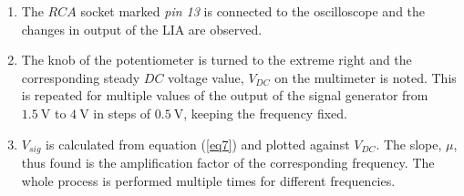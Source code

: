 \documentclass[%
 reprint,
nofootinbib,
 amsmath,amssymb,
 aps,
]{revtex4-2}
\begin{document}
\begin{enumerate}
        \item The $RCA$ socket marked \textit{pin 13} is connected to the oscilloscope and the changes in output of the LIA are observed.
        \item The knob of the potentiometer is turned to the extreme right and the corresponding steady $DC$ voltage value, $V_{DC}$ on the multimeter is noted. This is repeated for multiple values of the output of the signal generator from $\SI{1.5}{\volt}$ to $\SI{4}{\volt}$ in steps of $\SI{0.5}{\volt}$, keeping the frequency fixed.
        \item $V_{sig}$ is calculated from equation (\ref{eq7}) and plotted against $V_{DC}$. The slope, $\mu$, thus found is the amplification factor of the corresponding frequency. The whole process is performed multiple times for different frequencies.
    \end{enumerate}
\end{document}
